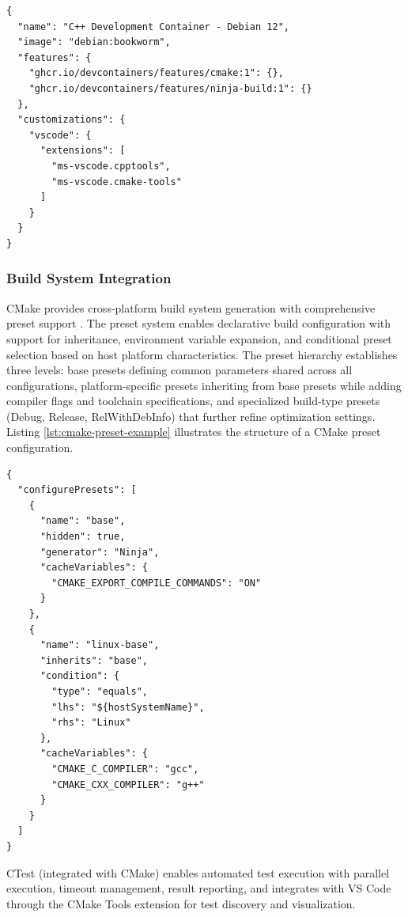 \newpage
\begin{lstlisting}[caption={DevContainer Configuration Structure},label=lst:devcontainer-example]
{
  "name": "C++ Development Container - Debian 12",
  "image": "debian:bookworm",
  "features": {
    "ghcr.io/devcontainers/features/cmake:1": {},
    "ghcr.io/devcontainers/features/ninja-build:1": {}
  },
  "customizations": {
    "vscode": {
      "extensions": [
        "ms-vscode.cpptools",
        "ms-vscode.cmake-tools"
      ]
    }
  }
}
\end{lstlisting}

\subsubsection{Build System Integration}

CMake provides cross-platform build system generation with comprehensive preset support \citep{swidzinskiModernCMakeEffortlessly2024}.
The preset system enables declarative build configuration with support for inheritance, environment variable expansion, and conditional preset selection based on host platform characteristics.
The preset hierarchy establishes three levels: base presets defining common parameters shared across all configurations, platform-specific presets inheriting from base presets while adding compiler flags and toolchain specifications, and specialized build-type presets (Debug, Release, RelWithDebInfo) that further refine optimization settings.
Listing \ref{lst:cmake-preset-example} illustrates the structure of a CMake preset configuration.

\begin{lstlisting}[caption={CMake Preset Configuration Structure},label=lst:cmake-preset-example]
{
  "configurePresets": [
    {
      "name": "base",
      "hidden": true,
      "generator": "Ninja",
      "cacheVariables": {
        "CMAKE_EXPORT_COMPILE_COMMANDS": "ON"
      }
    },
    {
      "name": "linux-base",
      "inherits": "base",
      "condition": {
        "type": "equals",
        "lhs": "${hostSystemName}",
        "rhs": "Linux"
      },
      "cacheVariables": {
        "CMAKE_C_COMPILER": "gcc",
        "CMAKE_CXX_COMPILER": "g++"
      }
    }
  ]
}
\end{lstlisting}

CTest (integrated with CMake) enables automated test execution with parallel execution, timeout management, result reporting, and integrates with VS Code through the CMake Tools extension for test discovery and visualization.

